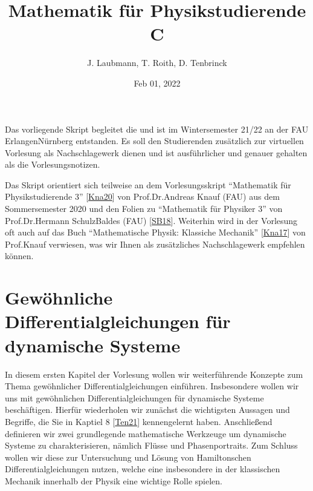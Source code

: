 \documentclass[letterpaper,10pt,english]{jupyterBook}
\title{Mathematik für Physikstudierende C}
\date{Feb 01, 2022}
\author{J.\@{} Laubmann, T.\@{} Roith, D.\@{} Tenbrinck}
\begin{document}
\pagestyle{empty}
\sphinxmaketitle
\pagestyle{plain}
\sphinxtableofcontents
\pagestyle{normal}
\label{\detokenize{intro::doc}}


\noindent{}

\sphinxAtStartPar
Das vorliegende Skript begleitet die  und ist im Wintersemester 21/22 an der FAU Erlangen\sphinxhyphen{}Nürnberg entstanden. Es soll den Studierenden zusätzlich zur virtuellen Vorlesung als Nachschlagewerk dienen und ist ausführlicher und genauer gehalten als die Vorlesungsnotizen.

\begin{DUlineblock}{0em}
\item[] 
\end{DUlineblock}

\sphinxAtStartPar
Das Skript orientiert sich teilweise an dem Vorlesungsskript “Mathematik für Physikstudierende 3” {[}\hyperlink{cite.references:id7}{Kna20}{]} von Prof.Dr.Andreas Knauf (FAU) aus dem Sommersemester 2020 und den Folien zu “Mathematik für Physiker 3” von Prof.Dr.Hermann Schulz\sphinxhyphen{}Baldes (FAU) {[}\hyperlink{cite.references:id10}{SB18}{]}. Weiterhin wird in der Vorlesung oft auch auf das Buch “Mathematische Physik: Klassiche Mechanik” {[}\hyperlink{cite.references:id8}{Kna17}{]} von Prof.Knauf verwiesen, was wir Ihnen als zusätzliches Nachschlagewerk empfehlen können.


\chapter{Gewöhnliche Differentialgleichungen für dynamische Systeme}
\label{\detokenize{ode/ode:gewohnliche-differentialgleichungen-fur-dynamische-systeme}}\label{\detokenize{ode/ode::doc}}
\sphinxAtStartPar
In diesem ersten Kapitel der Vorlesung wollen wir weiterführende Konzepte zum Thema gewöhnlicher Differentialgleichungen einführen.
Insbesondere wollen wir uns mit gewöhnlichen Differentialgleichungen für dynamische Systeme beschäftigen.
Hierfür wiederholen wir zunächst die wichtigsten Aussagen und Begriffe, die Sie in Kaptiel 8 {[}\hyperlink{cite.references:id12}{Ten21}{]} kennengelernt haben.
Anschließend definieren wir zwei grundlegende mathematische Werkzeuge um dynamische Systeme zu charakterisieren, nämlich Flüsse und Phasenportraits.
Zum Schluss wollen wir diese zur Untersuchung und Lösung von Hamiltonschen Differentialgleichungen nutzen, welche eine insbesondere in der klassischen Mechanik innerhalb der Physik eine wichtige Rolle spielen.
\end{document}
